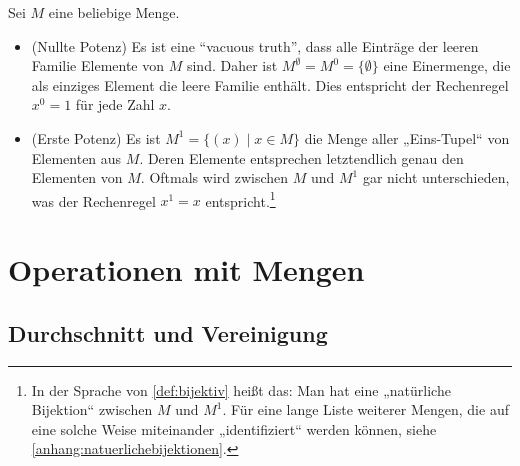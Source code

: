 \begin{bem}
    Sei $M$ eine beliebige Menge.
    \begin{itemize}
        \item(Nullte Potenz) Es ist eine ``vacuous truth'', dass alle Einträge der leeren Familie Elemente von $M$ sind. Daher ist $M^\emptyset=M^0 = \{\emptyset\}$ eine Einermenge, die als einziges Element die leere Familie enthält. Dies entspricht der Rechenregel $x^0=1$ für jede Zahl $x$.
        \item(Erste Potenz) Es ist $M^1 = \{(x)\mid x\in M\}$ die Menge aller „Eins-Tupel“ von Elementen aus $M$. Deren Elemente entsprechen letztendlich genau den Elementen von $M$. Oftmals wird zwischen $M$ und $M^1$ gar nicht unterschieden, was der Rechenregel $x^1=x$ entspricht.\footnote{In der Sprache von \cref{def:bijektiv} heißt das: Man hat eine „natürliche Bijektion“ zwischen $M$ und $M^1$. Für eine lange Liste weiterer Mengen, die auf eine solche Weise miteinander „identifiziert“ werden können, siehe \cref{anhang:natuerlichebijektionen}.}
    \end{itemize}
\end{bem}





\section{Operationen mit Mengen}


\subsection*{Durchschnitt und Vereinigung}


